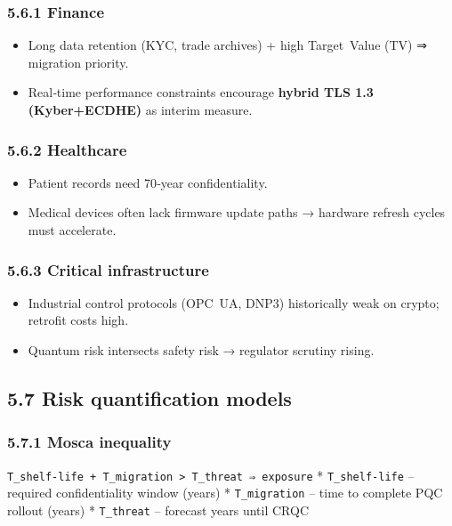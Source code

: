 \documentclass[
  english,
]{article}
\providecommand{\tightlist}{%
  \setlength{\itemsep}{0pt}\setlength{\parskip}{0pt}}
\begin{document}
\subsubsection{5.6.1 Finance}\label{finance}

\begin{itemize}
\tightlist
\item
  Long data retention (KYC, trade archives) + high Target~Value (TV) ⇒
  migration priority.
\item
  Real‑time performance constraints encourage \textbf{hybrid TLS 1.3
  (Kyber+ECDHE)} as interim measure.
\end{itemize}

\subsubsection{5.6.2 Healthcare}\label{healthcare}

\begin{itemize}
\tightlist
\item
  Patient records need 70‑year confidentiality.
\item
  Medical devices often lack firmware update paths → hardware refresh
  cycles must accelerate.
\end{itemize}

\subsubsection{5.6.3 Critical
infrastructure}\label{critical-infrastructure}

\begin{itemize}
\tightlist
\item
  Industrial control protocols (OPC~UA, DNP3) historically weak on
  crypto; retrofit costs high.
\item
  Quantum risk intersects safety risk → regulator scrutiny rising.
\end{itemize}

\subsection{5.7 Risk quantification
models}\label{risk-quantification-models}

\subsubsection{5.7.1 Mosca inequality}\label{mosca-inequality}

\texttt{T\_shelf‑life~+\ T\_migration~\textgreater{}~T\_threat~⇒\ exposure}
* \texttt{T\_shelf‑life} -- required confidentiality window (years) *
\texttt{T\_migration} -- time to complete PQC rollout (years) *
\texttt{T\_threat} -- forecast years until CRQC
\end{document}
